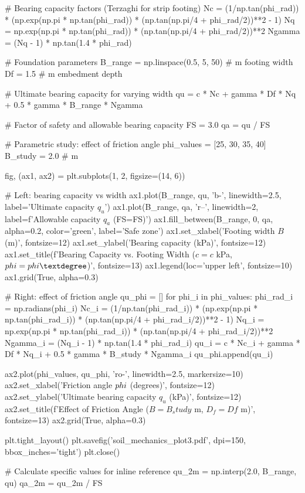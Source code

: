 \documentclass[11pt,a4paper]{article}
\begin{document}
\begin{pycode}
# Bearing capacity factors (Terzaghi for strip footing)
Nc = (1/np.tan(phi_rad)) * (np.exp(np.pi * np.tan(phi_rad)) *
     (np.tan(np.pi/4 + phi_rad/2))**2 - 1)
Nq = np.exp(np.pi * np.tan(phi_rad)) * (np.tan(np.pi/4 + phi_rad/2))**2
Ngamma = (Nq - 1) * np.tan(1.4 * phi_rad)

# Foundation parameters
B_range = np.linspace(0.5, 5, 50)  # m footing width
Df = 1.5  # m embedment depth

# Ultimate bearing capacity for varying width
qu = c * Nc + gamma * Df * Nq + 0.5 * gamma * B_range * Ngamma

# Factor of safety and allowable bearing capacity
FS = 3.0
qa = qu / FS

# Parametric study: effect of friction angle
phi_values = [25, 30, 35, 40]
B_study = 2.0  # m

fig, (ax1, ax2) = plt.subplots(1, 2, figsize=(14, 6))

# Left: bearing capacity vs width
ax1.plot(B_range, qu, 'b-', linewidth=2.5, label='Ultimate capacity $q_u$')
ax1.plot(B_range, qa, 'r--', linewidth=2, label=f'Allowable capacity $q_a$ (FS={FS})')
ax1.fill_between(B_range, 0, qa, alpha=0.2, color='green', label='Safe zone')
ax1.set_xlabel('Footing width $B$ (m)', fontsize=12)
ax1.set_ylabel('Bearing capacity (kPa)', fontsize=12)
ax1.set_title(f'Bearing Capacity vs. Footing Width ($c={c}$ kPa, $\\phi={phi}°$)', fontsize=13)
ax1.legend(loc='upper left', fontsize=10)
ax1.grid(True, alpha=0.3)

# Right: effect of friction angle
qu_phi = []
for phi_i in phi_values:
    phi_rad_i = np.radians(phi_i)
    Nc_i = (1/np.tan(phi_rad_i)) * (np.exp(np.pi * np.tan(phi_rad_i)) *
           (np.tan(np.pi/4 + phi_rad_i/2))**2 - 1)
    Nq_i = np.exp(np.pi * np.tan(phi_rad_i)) * (np.tan(np.pi/4 + phi_rad_i/2))**2
    Ngamma_i = (Nq_i - 1) * np.tan(1.4 * phi_rad_i)
    qu_i = c * Nc_i + gamma * Df * Nq_i + 0.5 * gamma * B_study * Ngamma_i
    qu_phi.append(qu_i)

ax2.plot(phi_values, qu_phi, 'ro-', linewidth=2.5, markersize=10)
ax2.set_xlabel('Friction angle $\\phi$ (degrees)', fontsize=12)
ax2.set_ylabel('Ultimate bearing capacity $q_u$ (kPa)', fontsize=12)
ax2.set_title(f'Effect of Friction Angle ($B={B_study}$ m, $D_f={Df}$ m)', fontsize=13)
ax2.grid(True, alpha=0.3)

plt.tight_layout()
plt.savefig('soil_mechanics_plot3.pdf', dpi=150, bbox_inches='tight')
plt.close()

# Calculate specific values for inline reference
qu_2m = np.interp(2.0, B_range, qu)
qa_2m = qu_2m / FS
\end{pycode}
\end{document}
